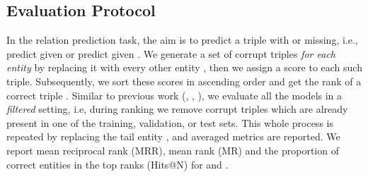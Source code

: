 \documentclass[11pt,a4paper]{article}
\begin{document}
\subsection{Evaluation Protocol}
\label{ssec:evaluation}
In the relation prediction task, the aim is to predict a triple  with  or  missing, i.e., 
predict  given  or predict  given . 
We generate a set of  corrupt triples \emph{for each entity}  by replacing it with every other entity , then we assign a score to each such triple. Subsequently, we sort these scores in ascending order and get the rank of a correct triple . Similar to previous work (\cite{NIPS2013_5071}, \cite{nguyen2018novel},  \cite{dettmers2018convolutional}), we evaluate all the models in a \emph{filtered} setting, i.e, during ranking we remove corrupt triples which are already present in one of the training, validation, or test sets. 
This whole process is repeated by replacing the tail entity , and averaged metrics are reported. We report mean reciprocal rank (MRR), mean rank (MR) and the proportion of correct entities in the top  ranks (Hits@N) for  and .

\begin{comment}
\begin{table*}[t!]
\centering\small
\begin{tabular}{l|ccccccc}
\cline{1-8}
       &               &              & \multicolumn{4}{c}{\# Edges} \\ 
       \cline{4-7}
Dataset   &  \#Entities  & \#Relations  & Trainig  & Validation  & Test & Total & \#Isolated nodes \\ 
\hline
WN18RR    & 40,943 & 11  & 86,835   & 3034   & 3134   & 93,003   & 384 \\ 
FB15k-237 & 14,541 & 237 & 272,115  & 17,535 & 20,466 & 310,116  & 36 \\ 
NELL-995  & 75,492 & 200 & 149,678  & 543    & 3992   & 154,213  & 1060 \\
Kinship   & 104    & 25  & 8544     & 1068   & 1074   & 10,686   & 0 \\
UMLS      & 135    & 46  & 5216     & 652    & 661    & 6529     & 4 \\
\hline

\end{tabular}
\caption{Dataset statistics
  }
  \label{tb:datasets}
\end{table*}
\end{comment}
\end{document}
